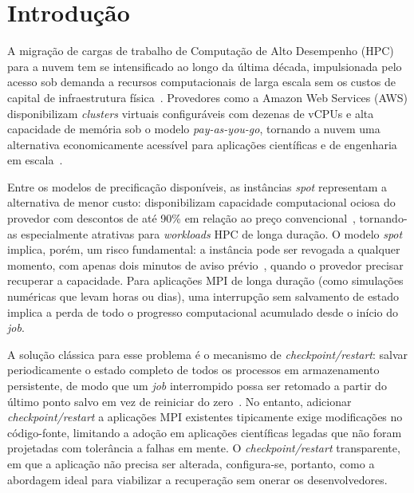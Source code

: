 
\chapter{Introdução}
\label{ch:introducao}

A migração de cargas de trabalho de Computação de Alto Desempenho (HPC) para a nuvem
tem se intensificado ao longo da última década, impulsionada pelo acesso sob demanda a
recursos computacionais de larga escala sem os custos de capital de infraestrutura
física~\cite{mell2011nist,gartner2022iaas}. Provedores como a Amazon Web Services (AWS)
disponibilizam \textit{clusters} virtuais configuráveis com dezenas de vCPUs e alta capacidade
de memória sob o modelo \textit{pay-as-you-go}, tornando a nuvem uma alternativa
economicamente acessível para aplicações científicas e de engenharia em
escala~\cite{netto2018hpccloud}.


Entre os modelos de precificação disponíveis, as instâncias \textit{spot} representam
a alternativa de menor custo: disponibilizam capacidade computacional ociosa do provedor
com descontos de até 90\% em relação ao preço convencional~\cite{aws2018spot}, tornando-as
especialmente atrativas para \textit{workloads} HPC de longa duração. O modelo
\textit{spot} implica, porém, um risco fundamental: a instância pode ser revogada a
qualquer momento, com apenas dois minutos de aviso prévio~\cite{aws2026spot_termination},
quando o provedor precisar recuperar a capacidade. Para aplicações MPI de longa duração
(como simulações numéricas que levam horas ou dias), uma interrupção sem salvamento de
estado implica a perda de todo o progresso computacional acumulado desde o início do
\textit{job}.

A solução clássica para esse problema é o mecanismo de \textit{checkpoint/restart}:
salvar periodicamente o estado completo de todos os processos em armazenamento
persistente, de modo que um \textit{job} interrompido possa ser retomado a partir do
último ponto salvo em vez de reiniciar do zero~\cite{hargrove2006blcr,moody2010scr}.
No entanto, adicionar \textit{checkpoint/restart} a aplicações MPI existentes
tipicamente exige modificações no código-fonte, limitando a adoção em aplicações
científicas legadas que não foram projetadas com tolerância a falhas em mente. O
\textit{checkpoint/restart} transparente, em que a aplicação não precisa ser
alterada, configura-se, portanto, como a abordagem ideal para viabilizar a recuperação
sem onerar os desenvolvedores.

